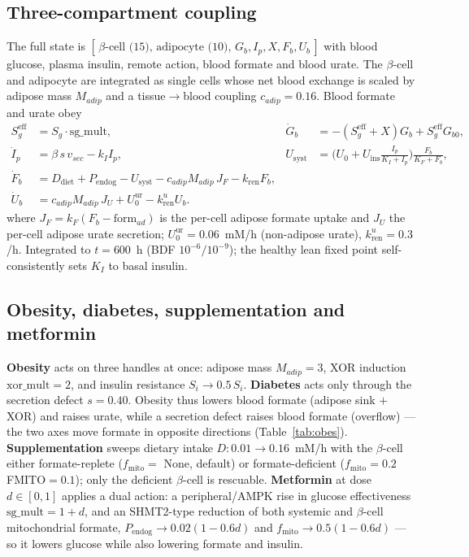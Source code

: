 \documentclass[11pt]{article}
\begin{document}
\subsection{Three-compartment coupling}
The full state is $[\,\text{$\beta$-cell (15)},\,\text{adipocyte (10)},\,G_b,I_p,X,F_b,U_b\,]$
with blood glucose, plasma insulin, remote action, blood formate and blood urate.
The $\beta$-cell and adipocyte are integrated as single cells whose net blood
exchange is scaled by adipose mass $M_{adip}$ and a tissue$\to$blood coupling
$c_{adip}=0.16$. Blood formate and urate obey
\begin{align}
S_g^{\mathrm{eff}}&=S_g\cdot\mathrm{sg\_mult}, &
\dot G_b&=-(S_g^{\mathrm{eff}}+X)G_b+S_g^{\mathrm{eff}}G_{b0},\\
\dot I_p&=\beta\,s\,v_{sec}-k_I I_p, &
U_{\mathrm{syst}}&=\Big(U_0+U_{\mathrm{ins}}\tfrac{I_p}{K_I+I_p}\Big)\tfrac{F_b}{K_F+F_b},\\
\dot F_b&=D_{\mathrm{diet}}+P_{\mathrm{endog}}-U_{\mathrm{syst}}-c_{adip}M_{adip}\,J_F-k_{\mathrm{ren}}F_b,\\
\dot U_b&=c_{adip}M_{adip}\,J_U+U_0^{\mathrm{ur}}-k_{\mathrm{ren}}^{u}U_b.
\end{align}
where $J_F=k_F(F_b-\mathrm{form}_{ad})$ is the per-cell adipose formate uptake and
$J_U$ the per-cell adipose urate secretion; $U_0^{\mathrm{ur}}=0.06$~mM/h
(non-adipose urate), $k_{\mathrm{ren}}^{u}=0.3$/h. Integrated to $t=600$~h
(BDF $10^{-6}/10^{-9}$); the healthy lean fixed point self-consistently sets $K_I$
to basal insulin.

\subsection{Obesity, diabetes, supplementation and metformin}
\textbf{Obesity} acts on three handles at once: adipose mass
$M_{adip}=3$, XOR induction $\mathrm{xor\_mult}=2$, and insulin resistance
$S_i\to0.5\,S_i$. \textbf{Diabetes} acts only through the secretion defect $s=0.40$.
Obesity thus lowers blood formate (adipose sink $+$ XOR) and raises urate, while a
secretion defect raises blood formate (overflow) --- the two axes move formate in
opposite directions (Table~\ref{tab:obes}).
\textbf{Supplementation} sweeps dietary intake $D:0.01\to0.16$~mM/h with the
$\beta$-cell either formate-replete ($f_{\mathrm{mito}}=$ None, default) or
formate-deficient ($f_{\mathrm{mito}}=0.2\,$FMITO$=0.1$); only the deficient
$\beta$-cell is rescuable.
\textbf{Metformin} at dose $d\in[0,1]$ applies a dual action: a peripheral/AMPK
rise in glucose effectiveness $\mathrm{sg\_mult}=1+d$, and an SHMT2-type reduction
of both systemic and $\beta$-cell mitochondrial formate,
$P_{\mathrm{endog}}\to0.02(1-0.6d)$ and $f_{\mathrm{mito}}\to0.5(1-0.6d)$ --- so it
lowers glucose while also lowering formate and insulin.
\end{document}
